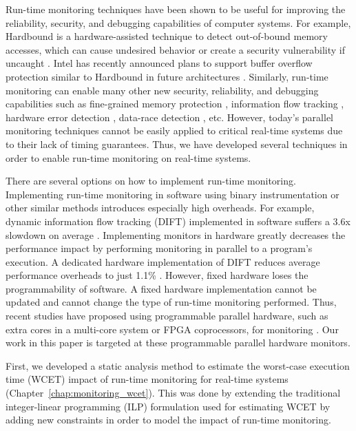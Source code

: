 Run-time monitoring techniques have been shown to be useful for improving the
reliability, security, and debugging capabilities of computer systems. For
example, Hardbound is a hardware-assisted technique to detect out-of-bound
memory accesses, which can cause undesired behavior or create a security
vulnerability if uncaught \cite{hardbound-asplos08}. Intel has recently
announced plans to support buffer overflow protection similar to Hardbound in
future architectures \cite{intel-mpx}. Similarly, run-time monitoring can
enable many other new security, reliability, and debugging capabilities such as
fine-grained memory protection \cite{mondrian-asplos02}, information flow
tracking \cite{dift-asplos04, testudo-micro08}, hardware error detection
\cite{argus-micro07}, data-race detection \cite{radish-isca12, cord-hpca06},
etc.  However, today's parallel monitoring techniques cannot be easily applied
to critical real-time systems due to their lack of timing guarantees. Thus, we
have developed several techniques in order to enable run-time monitoring on
real-time systems.

There are several options on how to implement run-time monitoring.
Implementing run-time monitoring in software using binary instrumentation or
other similar methods introduces especially high overheads. For example,
dynamic information flow tracking (DIFT) implemented in software suffers a 3.6x
slowdown on average \cite{qin06-lift}. Implementing monitors in hardware
greatly decreases the performance impact by performing monitoring in parallel
to a program's execution. A dedicated hardware implementation of DIFT reduces
average performance overheads to just 1.1\% \cite{suh-dift-asplos04}.  However,
fixed hardware loses the programmability of software. A fixed hardware
implementation cannot be updated and cannot change the type of run-time
monitoring performed. Thus, recent studies have proposed using programmable
parallel hardware, such as extra cores in a multi-core system or FPGA
coprocessors, for monitoring \cite{chen08-lba, deng-flexcore-micro10,
deng-harmoni-dsn12}. Our work in this paper is targeted at these programmable
parallel hardware monitors.

First, we developed a static analysis method to estimate the worst-case
execution time (WCET) impact of run-time monitoring for real-time systems
(Chapter~\ref{chap:monitoring_wcet}). This was done by extending the
traditional integer-linear programming (ILP) formulation used for estimating
WCET by adding new constraints in order to model the impact of run-time
monitoring.

